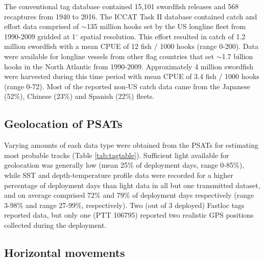 The conventional tag database contained 15,101 swordfish releases and 568 recaptures from 1940 to 2016. The ICCAT Task II database contained catch and effort data comprised of $\sim$135 million hooks set by the US longline fleet from 1990-2009 gridded at 1$^{\circ}$ spatial resolution. This effort resulted in catch of 1.2 million swordfish with a mean CPUE of 12 fish / 1000 hooks (range 0-200). Data were available for longline vessels from other flag countries that set $\sim$1.7 billion hooks in the North Atlantic from 1990-2009. Approximately 4 million swordfish were harvested during this time period with mean CPUE of 3.4 fish / 1000 hooks (range 0-72). Most of the reported non-US catch data came from the Japanese (52\%), Chinese (23\%) and Spanish (22\%) fleets.

\subsection{Geolocation of PSATs}%

Varying amounts of each data type were obtained from the PSATs for estimating most probable tracks (Table \ref{tab:tagtable}). Sufficient light available for geolocation was generally low (mean 25\% of deployment days, range 0-85\%), while SST and depth-temperature profile data were recorded for a higher percentage of deployment days than light data in all but one transmitted dataset, and on average comprised 72\% and 79\% of deployment days respectively (range 3-98\% and range 27-99\%, respectively). Two (out of 3 deployed) Fastloc tags reported data, but only one (PTT 106795) reported two realistic GPS positions collected during the deployment.

\subsection{Horizontal movements}%

